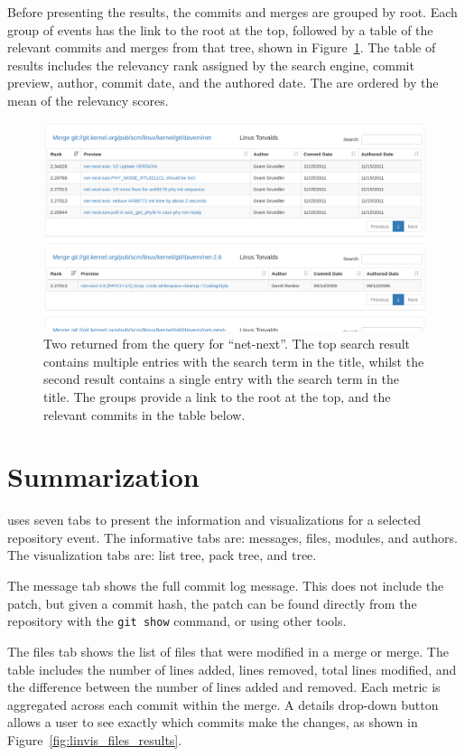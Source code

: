 Before presenting the results, the commits and merges are grouped by
\mt{} root. Each group of events has the link to the root at the
top, followed by a table of the relevant commits and merges from that
tree, shown in Figure~\ref{fig:linvis_search_results}. The table of
results includes the relevancy rank assigned by the search engine,
commit preview, author, commit date, and the authored date. The
 are ordered by the mean of the relevancy scores.

\begin{figure}[htpb]
  \centering
  \includegraphics[width=0.98\linewidth]{Figures/Linvis/search_results.png}
  \caption{Two  returned from the query for ``net-next''. The top
    search result contains multiple entries with the search term in the
    title, whilst the second result contains a single entry with the
    search term in the title. The groups provide a link to the root at
    the top, and the relevant commits in the table below.}
  \label{fig:linvis_search_results}
\end{figure}

\section{Summarization}\label{sec:summarization}

\tool{} uses seven tabs to present the information and visualizations
for a selected repository event.
The informative tabs are: messages, files, modules, and authors.
The visualization tabs are: list tree, pack tree, and \rt{} tree.

The message tab shows the full commit log message. This does not include
the patch, but given a commit hash, the patch can be found directly from
the repository with the \verb|git show| command, or using other tools.

The files tab shows the list of files that were modified in a merge or
merge. %
The table includes the number of lines added, lines removed, total lines
modified, and the difference between the number of lines added and
removed.
Each metric is aggregated across each commit within the merge.
A details drop-down button allows a user to see exactly which commits
make the changes, as shown in Figure~\ref{fig:linvis_files_results}.

